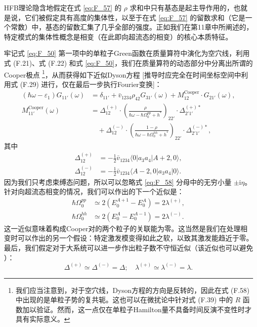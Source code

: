 HFB理论隐含地假定在式 \ref{eq:F_57} 的 $\rho$ 求和中只有基态是起主导作用的，也就是说，它们被假定具有高度的集体性，以至于在式
\ref{eq:F_57} 的留数求和（它是一个常数）中，基态的留数汇集了几乎全部的强度。正如我们在第11章中所阐述的，特定模式的集体性概念是相变（在此即向超流态的相变）的核心本质特征。

牢记式 \ref{eq:F_50} 第一项中的单粒子Green函数在质量算符中演化为空穴线，利用式 (F.21)、式 (F.22)
和式 \ref{eq:F_50}，我们在质量算符的动态部分中分离出所谓的Cooper极点 \cite{Pi61}\footnote{我们应当注意到，对于空穴线，Dyson方程的方向是反转的，因此在式 (F.58) 中出现的是单粒子势的复共轭。这也可以在微扰论中针对式
(F.39) 中的 $R$ 函数加以验证。然而，这一点仅在单粒子Hamilton量不具备时间反演不变性时才具有实际意义。}，从而获得如下近似Dyson方程 {[}推导时应完全在时间坐标空间中利用式 (F.29) 进行，仅在最后一步执行Fourier变换{]}：
\begin{align}
(\hbar\omega-\varepsilon_{1})G_{11'}(\omega) & =\delta_{11'}+\bar{v}_{1234}\rho_{42}G_{31'}(\omega)+M^{\text{Cooper}}_{12}\cdot G_{21'}(\omega),\nonumber \\
M^{\text{Cooper}}_{11'}(\omega) & =\Delta^{(+)}_{12}\cdot\left(\frac{\rho}{\hbar\omega-\hbar\Omega^{pp}_{0}+h^{*}}\right)_{22'}\cdot\Delta^{(+)*}_{2'1'}\nonumber \\
 & \quad+\Delta^{(-)}_{12}\cdot\left(\frac{1-\rho}{\hbar\omega-\hbar\Omega^{hh}_{0}+h^{*}}\right)_{22'}\cdot\Delta^{(-)*}_{2'1'},\label{eq:F_58}
\end{align}
其中
\begin{align}
\Delta^{(+)}_{12} & =-\frac{1}{2}\bar{v}_{1234}\langle0|a_{3}a_{4}|A+2,0\rangle,\nonumber \\
\Delta^{(-)}_{12} & =-\frac{1}{2}\bar{v}_{1234}\langle A-2,0|a_{3}a_{4}|0\rangle.\label{eq:F_59}
\end{align}
因为我们只考虑束缚态问题，所以可以忽略式 \ref{eq:F_58} 分母中的无穷小量 $\pm\mathrm{i}\eta$。针对向超流态相变的情况，我们可以作出的下一个近似是：
\begin{align}
\hbar\Omega^{pp}_{0} & \simeq2(E^{A+1}_{0}-E^{A}_{0})=2\lambda^{(+)},\nonumber \\
\hbar\Omega^{hh}_{0} & \simeq2(E^{A}_{0}-E^{A-1}_{0})=2\lambda^{(-)}.\label{eq:F_60}
\end{align}
这一近似意味着构成Cooper对的两个粒子的关联能为零。这当然是我们在处理相变时可以作出的另一个假设：特定激发模变得如此之软，以致其激发能趋近于零。最后，我们假定对于大系统可以进一步作出粒子数不守恒近似（该近似也可以避免
\cite[1.4.6节]{Mi67}）：
\begin{equation}
\Delta^{(+)}\simeq\Delta^{(-)}=\Delta;\quad\lambda^{(+)}\simeq\lambda^{(-)}=\lambda.\label{eq:F_61}
\end{equation}
